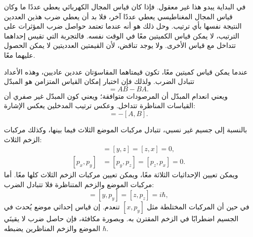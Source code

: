 في البداية يبدو هذا غير معقول. فإذا كان قياس المجال الكهربائي يعطي عددًا ما وكان قياس المجال المغناطيسي يعطي عددًا آخر، فلا بد أن يعطي ضرب هذين العددين النتيجة نفسها بأي ترتيب. وحل ذلك هو أنه عندما تعتمد حواصل ضرب المؤثرات على الترتيب، لا يمكن قياس الكميتين معًا في الوقت نفسه. فالتجربة التي تقيس إحداهما تتداخل مع قياس الأخرى. ولا يوجد تناقض، لأن القيمتين العدديتين لا يمكن الحصول عليهما معًا.

عندما يمكن قياس كميتين معًا، تكون قيمتاهما المقاسوَتان عددين عاديين، وهذه الأعداد تتبادل الضرب. ولذلك فإن اختبار إمكان القياس المتزامن هو المبدّل
\begin{equation}
[A,B]=AB-BA.
\end{equation}
ويعني انعدام المبدّل أن المرصودات متوافقة؛ ويعني كون المبدّل غير صفري أن القياسات المناظرة تتداخل. وعكس ترتيب المدخلين يعكس الإشارة:
\begin{equation}
[B,A]=-[A,B].
\end{equation}

بالنسبة إلى جسيم غير نسبي، تتبادل مركبات الموضع الثلاث فيما بينها، وكذلك مركبات الزخم الثلاث:
\begin{align}
[x,y]&=[y,z]=[z,x]=0,\\
[p_x,p_y]&=[p_y,p_z]=[p_z,p_x]=0.
\end{align}
ويمكن تعيين الإحداثيات الثلاثة معًا، ويمكن تعيين مركبات الزخم الثلاث كلها معًا. أما مركبات الموضع والزخم المتناظرة فلا تتبادل الضرب:
\begin{equation}
[x,p_x]=[y,p_y]=[z,p_z]=i\hbar,
\end{equation}
في حين أن المركبات المختلطة مثل \([x,p_y]\) تنعدم. إن قياس إحداثي موضع يُحدث في الجسيم اضطرابًا في الزخم المقترن به. وبصورة مكافئة، فإن حاصل ضرب لا يقينَي الموضع والزخم المناظرين يضبطه \(\hbar\).

\begin{classroomqa}
\end{classroomqa}

\begin{classroomqa}
\end{classroomqa}

